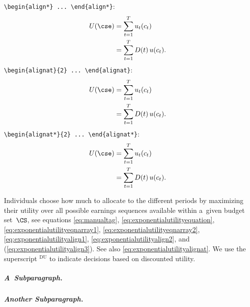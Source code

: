 \verb*|\begin{align*} ... \end{align*}|:
\begin{align*}
	U(\cse)
	& = \sum_{t=1}^{T} u_t(c_t) \\
	& = \sum_{t=1}^{T} D(t)\,u(c_t).
\end{align*}
\verb*|\begin{alignat}{2} ... \end{alignat}|:
\begin{alignat}{2}
	U(\cse)
	& = \sum_{t=1}^{T} u_t(c_t) \\
	& = \sum_{t=1}^{T} D(t)\,u(c_t).
	\label{eq:exponentialutilityalignat}
\end{alignat}
\verb*|\begin{alignat*}{2} ... \end{alignat*}|:
\begin{alignat*}{2}
	U(\cse)
	& = \sum_{t=1}^{T} u_t(c_t) \\
	& = \sum_{t=1}^{T} D(t)\,u(c_t).
\end{alignat*}

Individuals choose how much to allocate to the different periods by maximizing their utility over all possible earnings sequences available within a~given budget set~$\CS$, see equations
\eqref{eq:manualtag},
\eqref{eq:exponentialutilityequation},
\eqref{eq:exponentialutilityeqnarray1},
\eqref{eq:exponentialutilityeqnarray2},
\eqref{eq:exponentialutilityalign1},
\eqref{eq:exponentialutilityalign2}, and
(\ref{eq:exponentialutilityalign3}).
See also \autoref{eq:exponentialutilityalignat}.
We use the superscript $^\mathrm{DU}$ to indicate decisions based on discounted utility.

\subparagraph{A~Subparagraph.}
\Blindtext[2]

\subparagraph{Another Subparagraph.}
\blindtext

\displaybaselinegrid

